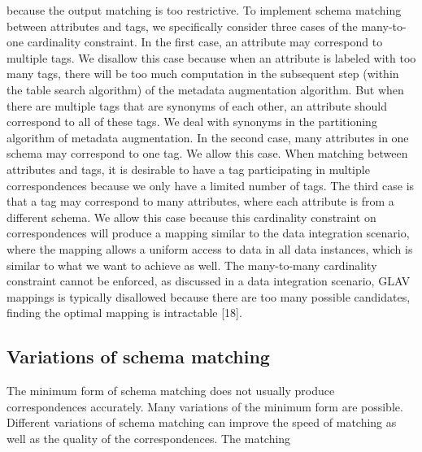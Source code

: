 because the output matching is too restrictive. To implement schema matching between attributes and tags, we specifically consider three cases of the many-to-one cardinality constraint.
In the first case, an attribute may correspond to multiple tags. We disallow this case because when an attribute is labeled with too many tags, there will be too much computation in the subsequent step (within the table search algorithm) of the metadata augmentation algorithm. But when there are multiple tags that are synonyms of each other, an attribute should correspond to all of these tags. We deal with synonyms in the partitioning algorithm of metadata augmentation. In the second case, many attributes in one schema may correspond to one tag. We allow this case. When matching between attributes and tags, it is desirable to have a tag participating in multiple correspondences because we only have a limited number of tags. The third case is that a tag may correspond to many attributes, where each attribute is from a different schema. We allow this case because this cardinality constraint on correspondences will produce a mapping similar to the data integration scenario, where the mapping allows a uniform access to data in all data instances, which is similar to what we want to achieve as well. The many-to-many cardinality constraint cannot be enforced, as discussed in a data integration scenario, GLAV mappings is typically disallowed because there are too many possible candidates, finding the optimal mapping is intractable \cite{Ehrig2004QOM}[18].

\subsection{Variations of schema matching}
\label{ssec:VariationsOfSchemaMatching}

The minimum form of schema matching does not usually produce correspondences accurately. Many variations of the minimum form are possible. Different variations of schema matching can improve the speed of matching as well as the quality of the correspondences. The matching

